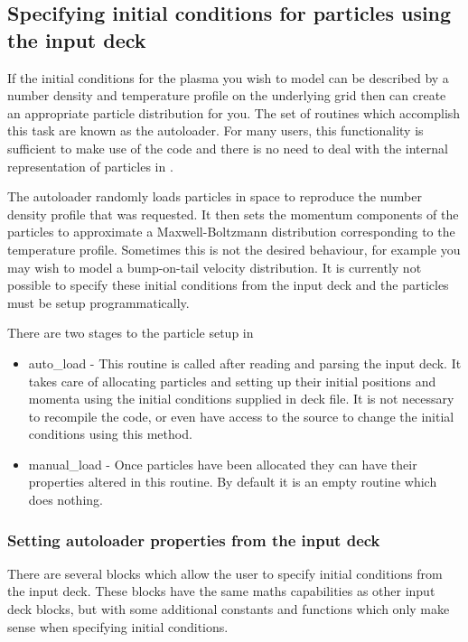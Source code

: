 \documentclass[12pt,a4paper]{article}
\newcommand{\EPOCH}{{\color{warwickdark}\fontfamily{phv}\selectfont{EPOCH}}}
\begin{document}
\subsection{Specifying initial conditions for particles using the input deck}

If the initial conditions for the plasma you wish to model can be described
by a number density and temperature profile on the underlying grid then
{\EPOCH} can create an appropriate particle distribution for you. The
set of routines which accomplish this task are known as the autoloader.
For many users, this functionality is sufficient to make use of the
code and there is no need to deal with the internal representation of
particles in {\EPOCH}.

The autoloader randomly loads particles in space to reproduce the number
density profile that was requested. It then sets the momentum components
of the particles to approximate a Maxwell-Boltzmann distribution
corresponding to the temperature profile. Sometimes this is not the
desired behaviour, for example you may wish to model a bump-on-tail
velocity distribution. It is currently not possible to specify these
initial conditions from the input deck and the particles must be setup
programmatically.

There are two stages to the particle setup in {\EPOCH} 

\begin{itemize}
\item auto\_load - This routine is called after reading and parsing the
  input deck. It takes care of allocating particles and setting up their
  initial positions and momenta using the initial conditions supplied in
  deck file.
  It is not necessary to recompile the code, or even have
  access to the source to change the initial conditions using this method.
\item manual\_load - Once particles have been allocated they can have their
  properties altered in this routine. By default it is an empty routine
  which does nothing.
\end{itemize}

\subsubsection{Setting autoloader properties from the input deck}
There are several blocks which allow the user to specify initial conditions
from the input deck. These blocks have the same maths capabilities as other
input deck blocks, but with some additional constants and functions which
only make sense when specifying initial conditions.\\
\end{document}
